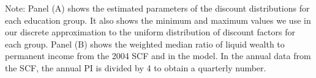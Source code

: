 \documentclass{econsocart}
\begin{document}
\begin{table}[tb] 
  \caption{\pregenmark Estimated discount factor distributions and estimation targets}
  \label{tab:estimBetas} 
  \centering


  \noindent\parbox{\textwidth}{
    \medskip
    \footnotesize Note: Panel (A) shows the estimated parameters of the discount distributions for each education group. It also shows the minimum and maximum values we use in our discrete approximation to the uniform distribution of discount factors for each group. Panel (B) shows the weighted median ratio of liquid wealth to permanent income from the 2004 SCF and in the model. In the annual data from the SCF, the annual PI is divided by 4 to obtain a quarterly number.
  }

\end{table}
\end{document}
